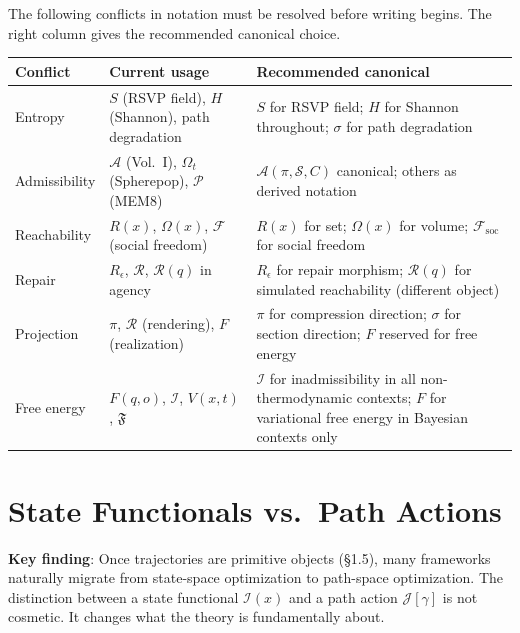 \documentclass[11pt, a4paper]{article}
\begin{document}
The following conflicts in notation must be resolved before writing
begins. The right column gives the recommended canonical choice.

\medskip
\begin{longtable}{p{3cm}p{5cm}p{4cm}}
\toprule
\textbf{Conflict} & \textbf{Current usage} & \textbf{Recommended canonical} \\
\midrule
Entropy & $S$ (RSVP field), $H$ (Shannon), path degradation & $S$ for RSVP
  field; $H$ for Shannon throughout; $\sigma$ for path degradation \\
Admissibility & $\mathcal{A}$ (Vol.~I), $\Omega_t$ (Spherepop),
  $\mathcal{P}$ (MEM\textbar{}8) & $\mathcal{A}(\pi, \mathcal{S}, C)$
  canonical; others as derived notation \\
Reachability & $R(x)$, $\Omega(x)$, $\mathcal{F}$ (social freedom) &
  $R(x)$ for set; $\Omega(x)$ for volume; $\mathcal{F}_\mathrm{soc}$ for
  social freedom \\
Repair & $R_\epsilon$, $\mathcal{R}$, $\mathcal{R}(q)$ in agency &
  $R_\epsilon$ for repair morphism; $\mathcal{R}(q)$ for simulated
  reachability (different object) \\
Projection & $\pi$, $\mathcal{R}$ (rendering), $F$ (realization) &
  $\pi$ for compression direction; $\sigma$ for section direction;
  $F$ reserved for free energy \\
Free energy & $F(q,o)$, $\mathcal{I}$, $V(x,t)$, $\mathfrak{F}$ &
  $\mathcal{I}$ for inadmissibility in all non-thermodynamic contexts;
  $F$ for variational free energy in Bayesian contexts only \\
\bottomrule
\end{longtable}

\section{State Functionals vs.\ Path Actions}

\begin{notebox}
\textbf{Key finding}: Once trajectories are primitive objects (§1.5),
many frameworks naturally migrate from state-space optimization to
path-space optimization. The distinction between a state functional
$\mathcal{I}(x)$ and a path action $\mathcal{J}[\gamma]$ is not
cosmetic. It changes what the theory is fundamentally about.
\end{notebox}
\end{document}
